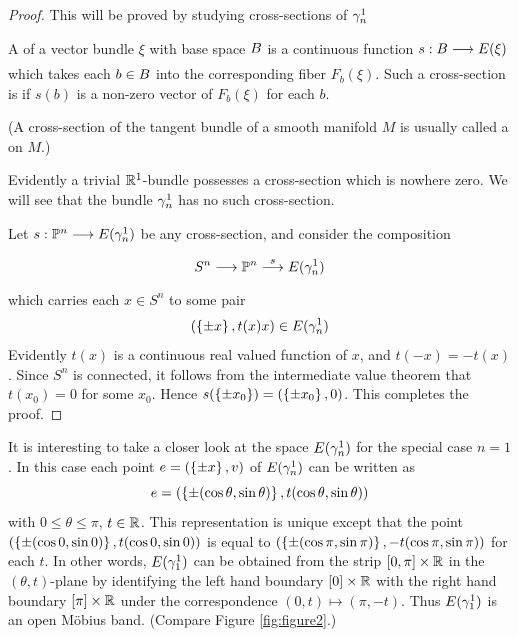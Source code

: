 \documentclass[../main]{subfiles}
\begin{document}
\begin{proof}
This will be proved by studying cross-sections of $\gamma_n^1$

\begin{definition}\label{def:02.03}

A  of a vector bundle $\xi$ with base space
${B}$ is a continuous function $s:{\B}\varrightarrow{} \total(\xi)$ which takes each $b \in {B}$ into the corresponding fiber $F_b (\xi)$. Such a cross-section is  if $s(b)$ is a non-zero vector of $F_b (\xi)$ for each $b$. 

(A cross-section of the tangent bundle of a smooth manifold $M$ is
usually called a  on $M$.)
	
\end{definition}


Evidently a trivial $\mathbb R^1$-bundle possesses a cross-section which is nowhere zero. We will see that the bundle $\gamma^1_n$ has no such cross-section.

Let $s:\projective^{n}\varrightarrow{} \total(\tautological^1_n)$
be any cross-section, and consider the composition
\[S^{n}\varrightarrow{}\projective^{n}\varrightarrow s \total(\tautological^1_n)\]
which carries each $x \in S^{n}$ to some pair
\[\left(\left\{\pm x\right\},t(x)x\right)\in E(\gamma^1_n)\]
Evidently $t(x)$ is a continuous real valued function of $x$, and $t(-x)=-t(x)$.
Since $S^{n}$ is connected, it follows from the intermediate value theorem
that $ t(x_0) = 0 $ for some $x_0$. Hence $s(\left\{\pm x_0\right\})=(\left\{\pm x_0\right\},0)$. This completes the proof.\end{proof}

It is interesting to take a closer look at the space $E(\gamma^1_n)$ for the 
special case $n = 1$. In this case each point $e = (\left\{\pm x\right\}, v)$ of $E(\gamma^1_n)$ can be written as
\[e = (\left\{\pm(\cos \theta, \sin \theta)\right\}, t(\cos \theta, \sin \theta))\]
with $0 \leq \theta \leq \pi$, $t\in \mathbb R$. This representation is unique except that the point
$(\left\{\pm(\cos 0, \sin 0)\right\}, t(\cos 0, \sin 0))$ is equal to $(\left\{\pm(\cos \pi, \sin \pi)\right\}, -t(\cos \pi, \sin \pi))$ for each $t$. In other words, $E(\gamma^1_1)$ can be obtained from
the strip $[0,\pi]\times \mathbb R$ in the $(\theta, t)$-plane by identifying the left hand 
boundary $[0]\times \mathbb R$ with the right hand boundary $[\pi]\times \mathbb R$ under the 
correspondence $(0,t) \mapsto (\pi,-t)$. Thus $E(\gamma^1_1)$ is an open M\"obius band. (Compare Figure \ref{fig:figure2}.)
\end{document}
